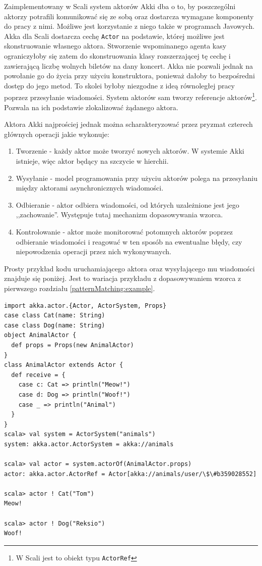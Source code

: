 \documentclass[brudnopis]{xmgr}
\begin{document}
Zaimplementowany w Scali system aktorów Akki dba o to, by poszczególni aktorzy potrafili komunikować się ze sobą oraz dostarcza wymagane komponenty do pracy z nimi. Możliwe jest korzystanie z niego także w programach Javowych. Akka dla Scali dostarcza cechę \texttt{Actor} na podstawie, której możliwe jest skonstruowanie własnego aktora. Stworzenie wspominanego agenta kasy ograniczyłoby się zatem do skonstruowania klasy rozszerzającej tę cechę i zawierającą liczbę wolnych biletów na dany koncert. Akka nie pozwali jednak na powołanie go do życia przy użyciu konstruktora, ponieważ dałoby to bezpośredni dostęp do jego metod. To skolei byłoby niezgodne z ideą równoległej pracy poprzez przesyłanie wiadomości. System aktorów sam tworzy referencje aktorów\footnote{W Scali jest to obiekt typu \texttt{ActorRef}}. Pozwala na ich podstawie zlokalizować żądanego aktora.

Aktora Akki najprościej jednak można scharakteryzować przez pryzmat czterech głównych operacji jakie wykonuje:

\begin{enumerate}
\item Tworzenie - każdy aktor może tworzyć nowych aktorów. W systemie Akki istnieje, więc aktor będący na szczycie w hierchii.
\item Wysyłanie - model programowania przy użyciu aktorów polega na przesyłaniu między aktorami asynchronicznych wiadomości. 
\item Odbieranie - aktor odbiera wiadomości, od których uzależnione jest jego ,,zachowanie''. Występuje tutaj mechanizm dopasowywania wzorca.
\item Kontrolowanie - aktor może monitorować potomnych aktorów poprzez odbieranie wiadomości i reagować w ten sposób na ewentualne błędy, czy niepowodzenia operacji przez nich wykonywanych.
\end{enumerate}

Prosty przykład kodu uruchamiającego aktora oraz wysyłającego mu wiadomości znajduje się poniżej. Jest to wariacja przykładu z dopasowywaniem wzorca z pierwszego rozdziału \ref{patternMatching:example}.

\begin{verbatim}
import akka.actor.{Actor, ActorSystem, Props}
case class Cat(name: String)
case class Dog(name: String)
object AnimalActor {
  def props = Props(new AnimalActor)
}
class AnimalActor extends Actor {
  def receive = {
    case c: Cat => println("Meow!")
    case d: Dog => println("Woof!")
    case _ => println("Animal")
  }
}
scala> val system = ActorSystem("animals")
system: akka.actor.ActorSystem = akka://animals

scala> val actor = system.actorOf(AnimalActor.props)
actor: akka.actor.ActorRef = Actor[akka://animals/user/\$\#b359028552]

scala> actor ! Cat("Tom")
Meow!

scala> actor ! Dog("Reksio")
Woof!
\end{verbatim}
\end{document}
